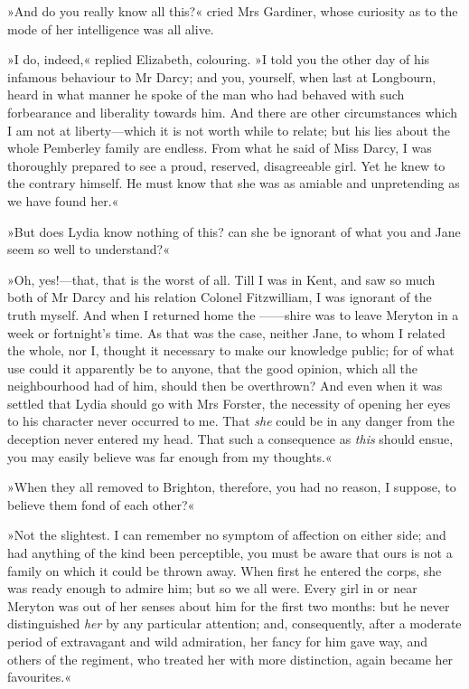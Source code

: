 »And do you really know all this?« cried Mrs Gardiner, whose curiosity as to the mode of her intelligence was all alive.

»I do, indeed,« replied Elizabeth, colouring. »I told you the other day of his infamous behaviour to Mr Darcy; and you, yourself, when last at Longbourn, heard in what manner he spoke of the man who had behaved with such forbearance and liberality towards him. And there are other circumstances which I am not at liberty—which it is not worth while to relate; but his lies about the whole Pemberley family are endless. From what he said of Miss Darcy, I was thoroughly prepared to see a proud, reserved, disagreeable girl. Yet he knew to the contrary himself. He must know that she was as amiable and unpretending as we have found her.«

»But does Lydia know nothing of this? can she be ignorant of what you and Jane seem so well to understand?«

»Oh, yes!—that, that is the worst of all. Till I was in Kent, and saw so much both of Mr Darcy and his relation Colonel Fitzwilliam, I was ignorant of the truth myself. And when I returned home the ——shire was to leave Meryton in a week or fortnight's time. As that was the case, neither Jane, to whom I related the whole, nor I, thought it necessary to make our knowledge public; for of what use could it apparently be to anyone, that the good opinion, which all the neighbourhood had of him, should then be overthrown? And even when it was settled that Lydia should go with Mrs Forster, the necessity of opening her eyes to his character never occurred to me. That \textit{she} could be in any danger from the deception never entered my head. That such a consequence as \textit{this} should ensue, you may easily believe was far enough from my thoughts.«

»When they all removed to Brighton, therefore, you had no reason, I suppose, to believe them fond of each other?«

»Not the slightest. I can remember no symptom of affection on either side; and had anything of the kind been perceptible, you must be aware that ours is not a family on which it could be thrown away. When first he entered the corps, she was ready enough to admire him; but so we all were. Every girl in or near Meryton was out of her senses about him for the first two months: but he never distinguished \textit{her} by any particular attention; and, consequently, after a moderate period of extravagant and wild admiration, her fancy for him gave way, and others of the regiment, who treated her with more distinction, again became her favourites.«

